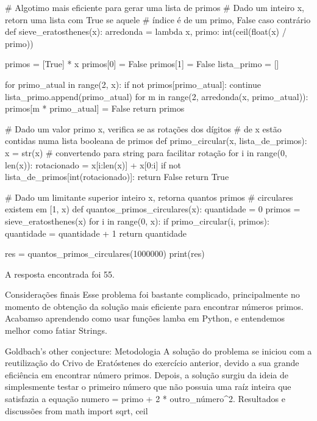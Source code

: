             # Algotimo mais eficiente para gerar uma lista de primos
            # Dado um inteiro x, retorn uma lista com True se aquele 
            # índice é de um primo, False caso contrário
            def sieve_eratosthenes(x):
                arredonda = lambda x, primo: int(ceil(float(x) / primo))

                primos = [True] * x
                primos[0] = False
                primos[1] = False
                lista_primo = []

                for primo_atual in range(2, x):
                    if not primos[primo_atual]:
                        continue
                    lista_primo.append(primo_atual)
                    for m in range(2, arredonda(x, primo_atual)):
                        primos[m * primo_atual] = False
                return primos

            # Dado um valor primo x, verifica se as rotações dos dígitos 
            # de x estão contidas numa lista booleana de primos
            def primo_circular(x, lista_de_primos):
                x = str(x) # convertendo para string para facilitar rotação
                for i in range(0, len(x)):
                    rotacionado = x[i:len(x)] + x[0:i]
                    if not lista_de_primos[int(rotacionado)]:
                        return False
                return True

            # Dado um limitante superior inteiro x, retorna quantos primos
            # circulares existem em [1, x)
            def quantos_primos_circulares(x):
                quantidade = 0
                primos = sieve_eratosthenes(x)
                for i in range(0, x):
                    if primo_circular(i, primos):
                        quantidade = quantidade + 1
                return quantidade

            res = quantos_primos_circulares(1000000)
            print(res)

            A resposta encontrada foi 55.

        Considerações finais
            Esse problema foi bastante complicado, principalmente no momento de obtenção da solução mais eficiente para encontrar números primos. Acabamso aprendendo como usar funções lamba em Python, e entendemos melhor como fatiar Strings.
    
    Goldbach's other conjecture:
        Metodologia
            A solução do problema se iniciou com a reutilização do Crivo de Eratóstenes do exercício anterior, devido a sua grande eficiência em encontrar número primos. Depois, a solução surgiu da ideia de simplesmente testar o primeiro número que não possuia uma raíz inteira que satisfazia a equação numero = primo + 2 * outro_número^2.
        Resultados e discussões
            from math import sqrt, ceil

